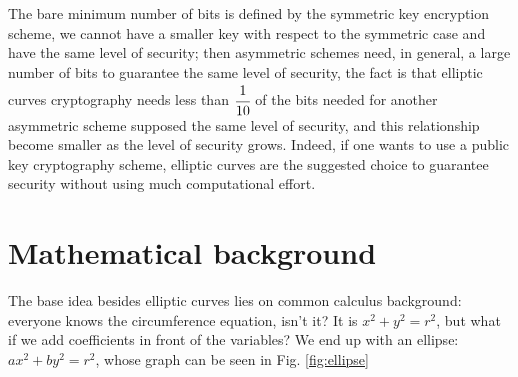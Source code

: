 \documentclass{article}
\begin{document}
The bare minimum number of bits is defined by the symmetric key encryption scheme, we cannot have a smaller key with respect to the symmetric case and have the same level of security; then asymmetric schemes need, in general, a large number of bits to guarantee the same level of security, the fact is that elliptic curves cryptography needs less than $\cfrac{1}{10}$ of the bits needed for another asymmetric scheme supposed the same level of security, and this relationship become smaller as the level of security grows. Indeed, if one wants to use a public key cryptography scheme, elliptic curves are the suggested choice to guarantee security without using much computational effort.


\section{Mathematical background}

The base idea besides elliptic curves lies on common calculus background: everyone knows the circumference equation, isn't it? It is $x^2 + y^2 = r^2$, but what if we add coefficients in front of the variables? We end up with an ellipse: $ax^2 + by^2 = r^2$, whose graph can be seen in Fig. \ref{fig:ellipse} 
\end{document}
